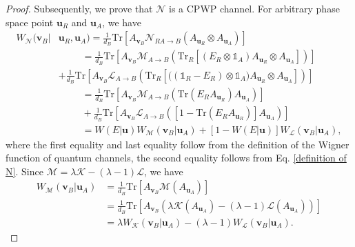 \documentclass[aps,pra,twocolumn,floatfix,amsfonts,10pt]{revtex4-2}
\begin{document}
\begin{proof}
	Subsequently, we prove that $\mathcal{N}$ is a CPWP channel.
	For arbitrary phase space point $\mathbf{u}_R$ and $\mathbf{u}_A$, we have
	\begin{equation}
		\begin{aligned}
			W_{\mathcal{N}}(\mathbf{v}_B|&\mathbf{u}_R,\mathbf{u}_A) = \frac{1}{d_B}\mathrm{Tr}\left[A_{\mathbf{v}_B}\mathcal{N}_{RA\rightarrow B}\left(A_{\mathbf{u}_R}\otimes A_{\mathbf{u}_A}\right)\right] \\ &~~~~~~~~~~~= \frac{1}{d_B}\mathrm{Tr}\left[A_{\mathbf{v}_B}\mathcal{M}_{A\rightarrow B}\left(\mathrm{Tr}_R\left[(E_R\otimes\mathds{1}_A)A_{\mathbf{u}_R}\otimes A_{\mathbf{u}_A}\right]\right)\right] \\ &+ \frac{1}{d_B}\mathrm{Tr}\left[A_{\mathbf{v}_B}\mathcal{L}_{A\rightarrow B}\left(\mathrm{Tr}_R\left[\bigl((\mathds{1}_R-E_R)\otimes\mathds{1}_A\bigr)A_{\mathbf{u}_R}\otimes A_{\mathbf{u}_A}\right]\right)\right] \\ &~~~~~~~~~~~= \frac{1}{d_B}\mathrm{Tr}\left[A_{\mathbf{v}_B}\mathcal{M}_{A\rightarrow B}\left(\mathrm{Tr}(E_RA_{\mathbf{u}_R})A_{\mathbf{u}_A}\right)\right] \\ &~~~~~~~~~~~+ \frac{1}{d_B}\mathrm{Tr}\left[A_{\mathbf{v}_B}\mathcal{L}_{A\rightarrow B}\left([1-\mathrm{Tr}(E_RA_{\mathbf{u}_R})]A_{\mathbf{u}_A}\right)\right] \\ &~~~~~~~~~~~= W(E|\mathbf{u}) W_{\mathcal{M}}(\mathbf{v}_B|\mathbf{u}_A) + [1-W(E|\mathbf{u})]W_{\mathcal{L}}(\mathbf{v}_B|\mathbf{u}_A),
		\end{aligned}
	\end{equation}
	where the first equality and last equality follow from the definition of the Wigner function of quantum channels, the second equality follows from Eq. \eqref{definition of N}.
	Since $\mathcal{M} = \lambda \mathcal{K} - (\lambda-1)\mathcal{L}$, we have 
	\begin{equation}
		\begin{aligned}
			W_{\mathcal{M}}(\mathbf{v}_B|\mathbf{u}_A) &= \frac{1}{d_B}\mathrm{Tr}\left[A_{\mathbf{v}_B}\mathcal{M}(A_{\mathbf{u}_A})\right] \\ &= \frac{1}{d_B}\mathrm{Tr}\left[A_{\mathbf{v}_B}\left(\lambda \mathcal{K}(A_{\mathbf{u}_A}) - (\lambda-1)\mathcal{L} (A_{\mathbf{u}_A})\right)\right] \\ &= \lambda W_{\mathcal{K}}(\mathbf{v}_B|\mathbf{u}_A)- (\lambda-1)W_{\mathcal{L}}(\mathbf{v}_B|\mathbf{u}_A).
		\end{aligned}
	\end{equation}

\end{proof}
\end{document}

